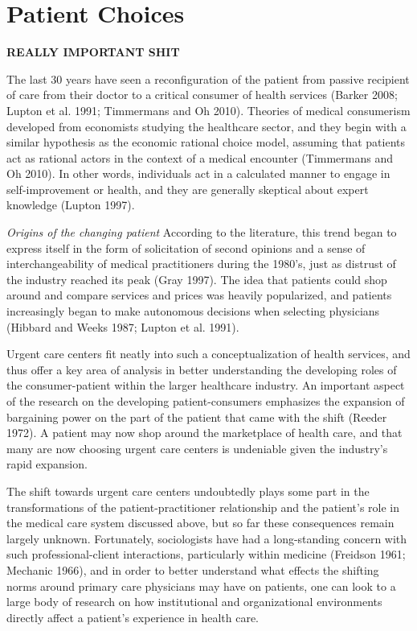 \documentclass[12pt,twoside]{reedthesis}
\begin{document}
  \section*{Patient Choices}\label{patient-choices}
  
  \textbf{REALLY IMPORTANT SHIT}
  
  The last 30 years have seen a reconfiguration of the patient from
  passive recipient of care from their doctor to a critical consumer of
  health services (Barker 2008; Lupton et al. 1991; Timmermans and Oh
  2010). Theories of medical consumerism developed from economists
  studying the healthcare sector, and they begin with a similar hypothesis
  as the economic rational choice model, assuming that patients act as
  rational actors in the context of a medical encounter (Timmermans and Oh
  2010). In other words, individuals act in a calculated manner to engage
  in self-improvement or health, and they are generally skeptical about
  expert knowledge (Lupton 1997).
  
  \emph{Origins of the changing patient} According to the literature, this
  trend began to express itself in the form of solicitation of second
  opinions and a sense of interchangeability of medical practitioners
  during the 1980's, just as distrust of the industry reached its peak
  (Gray 1997). The idea that patients could shop around and compare
  services and prices was heavily popularized, and patients increasingly
  began to make autonomous decisions when selecting physicians (Hibbard
  and Weeks 1987; Lupton et al. 1991).
  
  Urgent care centers fit neatly into such a conceptualization of health
  services, and thus offer a key area of analysis in better understanding
  the developing roles of the consumer-patient within the larger
  healthcare industry. An important aspect of the research on the
  developing patient-consumers emphasizes the expansion of bargaining
  power on the part of the patient that came with the shift (Reeder 1972).
  A patient may now shop around the marketplace of health care, and that
  many are now choosing urgent care centers is undeniable given the
  industry's rapid expansion.
  
  The shift towards urgent care centers undoubtedly plays some part in the
  transformations of the patient-practitioner relationship and the
  patient's role in the medical care system discussed above, but so far
  these consequences remain largely unknown. Fortunately, sociologists
  have had a long-standing concern with such professional-client
  interactions, particularly within medicine (Freidson 1961; Mechanic
  1966), and in order to better understand what effects the shifting norms
  around primary care physicians may have on patients, one can look to a
  large body of research on how institutional and organizational
  environments directly affect a patient's experience in health care.
  
\end{document}
